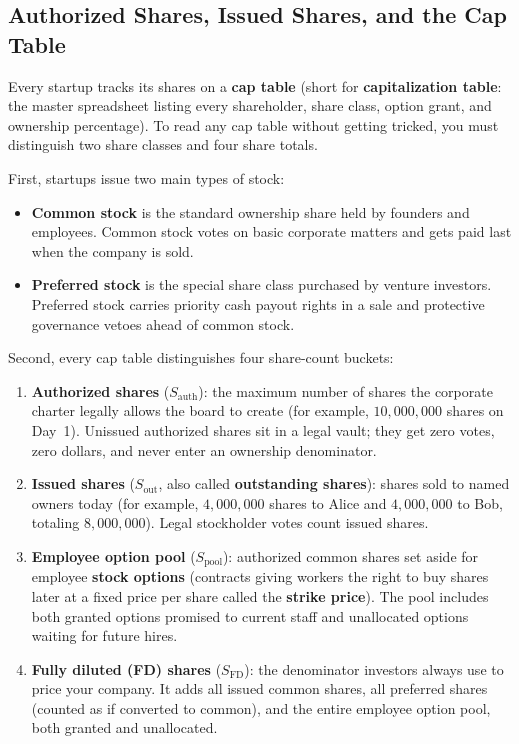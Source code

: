 \subsection{Authorized Shares, Issued Shares, and the Cap Table}

Every startup tracks its shares on a \textbf{cap table} (short for \textbf{capitalization table}: the master spreadsheet listing every shareholder, share class, option grant, and ownership percentage). To read any cap table without getting tricked, you must distinguish two share classes and four share totals.

First, startups issue two main types of stock:
\begin{itemize}
  \item \textbf{Common stock} is the standard ownership share held by founders and employees. Common stock votes on basic corporate matters and gets paid last when the company is sold.
  \item \textbf{Preferred stock} is the special share class purchased by venture investors. Preferred stock carries priority cash payout rights in a sale and protective governance vetoes ahead of common stock.
\end{itemize}

Second, every cap table distinguishes four share-count buckets:
\begin{enumerate}
  \item \textbf{Authorized shares} ($S_{\text{auth}}$): the maximum number of shares the corporate charter legally allows the board to create (for example, $10{,}000{,}000$ shares on Day~1). Unissued authorized shares sit in a legal vault; they get zero votes, zero dollars, and never enter an ownership denominator.
  \item \textbf{Issued shares} ($S_{\text{out}}$, also called \textbf{outstanding shares}): shares sold to named owners today (for example, $4{,}000{,}000$ shares to Alice and $4{,}000{,}000$ to Bob, totaling $8{,}000{,}000$). Legal stockholder votes count issued shares.
  \item \textbf{Employee option pool} ($S_{\text{pool}}$): authorized common shares set aside for employee \textbf{stock options} (contracts giving workers the right to buy shares later at a fixed price per share called the \textbf{strike price}). The pool includes both granted options promised to current staff and unallocated options waiting for future hires.
  \item \textbf{Fully diluted (FD) shares} ($S_{\text{FD}}$): the denominator investors always use to price your company. It adds all issued common shares, all preferred shares (counted as if converted to common), and the entire employee option pool, both granted and unallocated.
\end{enumerate}

